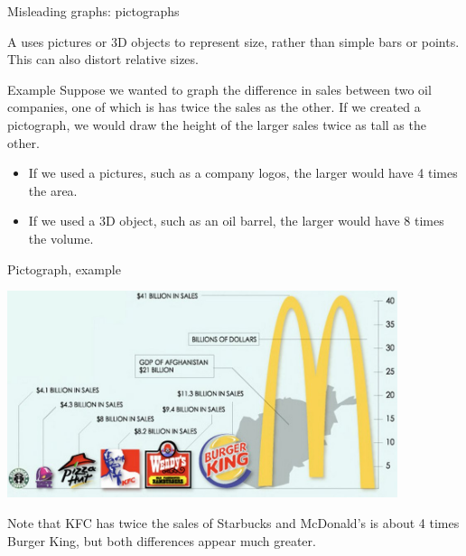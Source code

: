 \documentclass[handout]{beamer}
\begin{document}
\begin{frame}{Misleading graphs: pictographs}
\begin{block}{}
A  uses pictures or 3D objects to represent size, rather than simple bars or points. This can also distort relative sizes.
\end{block}

\pause
\begin{exampleblock}{Example}
Suppose we wanted to graph the difference in sales between two oil companies, one of which is has twice the sales as the other. If we created a pictograph, we would draw the height of the larger sales twice as tall as the other.
\begin{itemize}
\item If we used a pictures, such as a company logos, the larger would have 4 times the area.
\item If we used a 3D object, such as an oil barrel, the larger would have 8 times the volume. 
\end{itemize}
\end{exampleblock}
\end{frame}

\begin{frame}{Pictograph, example}
\begin{center}
\includegraphics[width=4.5in]{../images/ch02_fastfood_pictograph}
\end{center}
\begin{block}{}
Note that KFC has twice the sales of Starbucks and McDonald's is about 4 times Burger King, but both differences appear much greater.
\end{block}
\end{frame}
\end{document}
